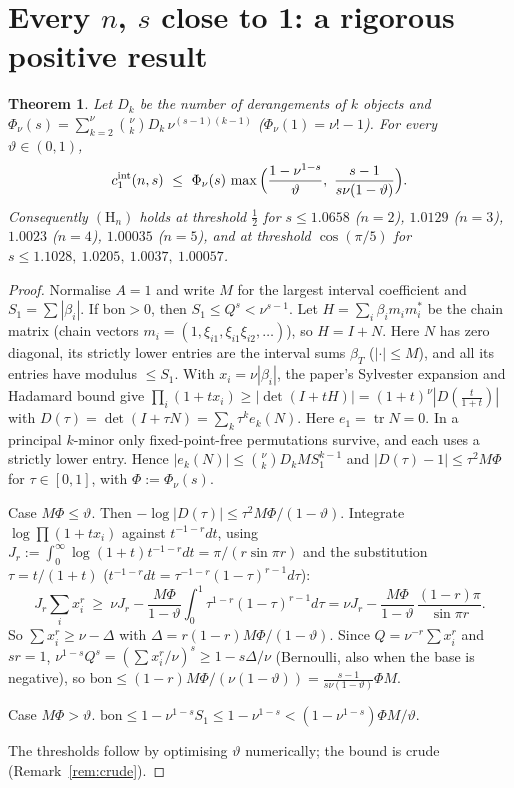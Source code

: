 \documentclass[11pt]{article}
\newtheorem{theorem}{Theorem}\newtheorem{proposition}[theorem]{Proposition}
\theoremstyle{definition}\newtheorem{definition}[theorem]{Definition}\newtheorem{remark}[theorem]{Remark}
\begin{document}
\section{Every $n$, $s$ close to 1: a rigorous positive result}
\begin{theorem}\label{thm:small}
Let $D_k$ be the number of derangements of $k$ objects and $\Phi_\nu(s)=\sum_{k=2}^{\nu}\binom\nu kD_k\,\nu^{(s-1)(k-1)}$
($\Phi_\nu(1)=\nu!-1$).  For every $\vartheta\in(0,1)$,
\[c_1^{\rm int}(n,s)\ \le\ \Phi_\nu(s)\,\max\Big(\frac{1-\nu^{1-s}}{\vartheta},\ \frac{s-1}{s\nu(1-\vartheta)}\Big).\]
Consequently $(\mathrm H_n)$ holds at threshold $\frac12$ for $s\le1.0658$ ($n=2$), $1.0129$ ($n=3$), $1.0023$ ($n=4$),
$1.00035$ ($n=5$), and at threshold $\cos(\pi/5)$ for $s\le1.1028,\ 1.0205,\ 1.0037,\ 1.00057$.
\end{theorem}
\begin{proof}
Normalise $A=1$ and write $M$ for the largest interval coefficient and $S_1=\sum|\beta_i|$.  If $\mathrm{bon}>0$, then $S_1\le Q^s<\nu^{s-1}$.
Let $H=\sum_i\beta_im_im_i^*$ be the chain matrix (chain vectors $m_i=(1,\xi_{i1},\xi_{i1}\xi_{i2},\dots)$), so $H=I+N$.  Here $N$ has zero diagonal,
its strictly lower entries are the interval sums $\beta_T$ ($|\cdot|\le M$), and all its entries have modulus $\le S_1$.  With
$x_i=\nu|\beta_i|$, the paper's Sylvester expansion and Hadamard bound give $\prod_i(1+tx_i)\ge|\det(I+tH)|=(1+t)^\nu|D(\tfrac t{1+t})|$
with $D(\tau)=\det(I+\tau N)=\sum_k\tau^ke_k(N)$.  Here $e_1=\operatorname{tr}N=0$.  In a principal $k$-minor only fixed-point-free
permutations survive, and each uses a strictly lower entry.  Hence $|e_k(N)|\le\binom\nu kD_kMS_1^{k-1}$ and
$|D(\tau)-1|\le\tau^2M\Phi$ for $\tau\in[0,1]$, with $\Phi:=\Phi_\nu(s)$.

Case $M\Phi\le\vartheta$.  Then $-\log|D(\tau)|\le\tau^2M\Phi/(1-\vartheta)$.  Integrate $\log\prod(1+tx_i)$ against $t^{-1-r}dt$, using
$J_r:=\int_0^\infty\log(1+t)t^{-1-r}dt=\pi/(r\sin\pi r)$ and the substitution $\tau=t/(1+t)$
($t^{-1-r}dt=\tau^{-1-r}(1-\tau)^{r-1}d\tau$):
\[J_r\sum_ix_i^r\ \ge\ \nu J_r-\frac{M\Phi}{1-\vartheta}\int_0^1\tau^{1-r}(1-\tau)^{r-1}d\tau=\nu J_r-\frac{M\Phi}{1-\vartheta}\,\frac{(1-r)\pi}{\sin\pi r}.\]
So $\sum x_i^r\ge\nu-\Delta$ with $\Delta=r(1-r)M\Phi/(1-\vartheta)$.  Since $Q=\nu^{-r}\sum x_i^r$ and $sr=1$,
$\nu^{1-s}Q^s=(\sum x_i^r/\nu)^s\ge1-s\Delta/\nu$ (Bernoulli, also when the base is negative), so
$\mathrm{bon}\le(1-r)M\Phi/(\nu(1-\vartheta))=\frac{s-1}{s\nu(1-\vartheta)}\Phi M$.

Case $M\Phi>\vartheta$.  $\mathrm{bon}\le1-\nu^{1-s}S_1\le1-\nu^{1-s}<(1-\nu^{1-s})\Phi M/\vartheta$.

The thresholds follow by optimising $\vartheta$ numerically; the bound is crude (Remark~\ref{rem:crude}).
\end{proof}
\end{document}
